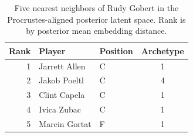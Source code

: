\begin{table}[htbp]
  \centering\small
  \begin{tabular}{rllc}
    \toprule
    Rank & Player & Position & Archetype \\
    \midrule
    1 & Jarrett Allen & C & 1 \\
    2 & Jakob Poeltl & C & 4 \\
    3 & Clint Capela & C & 1 \\
    4 & Ivica Zubac & C & 1 \\
    5 & Marcin Gortat & F & 1 \\
    \bottomrule
  \end{tabular}
  \caption{Five nearest neighbors of Rudy Gobert in the Procrustes-aligned posterior latent space. Rank is by posterior mean embedding distance.}
  \label{tab:Rudy_Gobert_neighbors}
\end{table}

